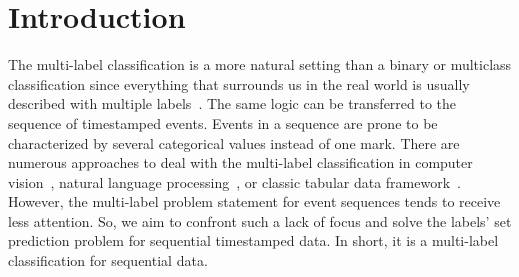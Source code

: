 \documentclass[runningheads]{llncs}
\begin{document}



\section{Introduction}

The multi-label classification is a more natural setting than a binary or multiclass classification since everything that surrounds us in the real world is usually described with multiple labels~\cite{liu2021emerging}. The same logic can be transferred to the sequence of timestamped events. Events in a sequence are prone to be characterized by several categorical values instead of one mark. There are numerous approaches to deal with the multi-label classification in computer vision~\cite{durand2019learning}, natural language processing~\cite{xiao2019label}, or classic tabular data framework~\cite{tarekegn2021review}. However, the multi-label problem statement for event sequences tends to receive less attention. So, we aim to confront such a lack of focus and solve the labels' set prediction problem for sequential timestamped data. In short, it is a multi-label classification for sequential data. 
\end{document}
